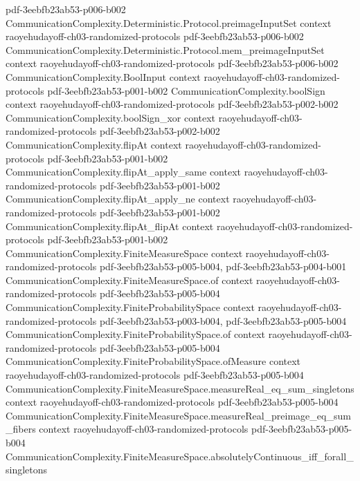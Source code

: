 \begin{theorem}
  {pdf-3eebfb23ab53-p006-b002}
\proofstep
  {CommunicationComplexity.Deterministic.Protocol.preimageInputSet}
  {context}
  {raoyehudayoff-ch03-randomized-protocols}
  {pdf-3eebfb23ab53-p006-b002}
\proofstep
  {CommunicationComplexity.Deterministic.Protocol.mem_preimageInputSet}
  {context}
  {raoyehudayoff-ch03-randomized-protocols}
  {pdf-3eebfb23ab53-p006-b002}
\proofstep
  {CommunicationComplexity.BoolInput}
  {context}
  {raoyehudayoff-ch03-randomized-protocols}
  {pdf-3eebfb23ab53-p001-b002}
\proofstep
  {CommunicationComplexity.boolSign}
  {context}
  {raoyehudayoff-ch03-randomized-protocols}
  {pdf-3eebfb23ab53-p002-b002}
\proofstep
  {CommunicationComplexity.boolSign_xor}
  {context}
  {raoyehudayoff-ch03-randomized-protocols}
  {pdf-3eebfb23ab53-p002-b002}
\proofstep
  {CommunicationComplexity.flipAt}
  {context}
  {raoyehudayoff-ch03-randomized-protocols}
  {pdf-3eebfb23ab53-p001-b002}
\proofstep
  {CommunicationComplexity.flipAt_apply_same}
  {context}
  {raoyehudayoff-ch03-randomized-protocols}
  {pdf-3eebfb23ab53-p001-b002}
\proofstep
  {CommunicationComplexity.flipAt_apply_ne}
  {context}
  {raoyehudayoff-ch03-randomized-protocols}
  {pdf-3eebfb23ab53-p001-b002}
\proofstep
  {CommunicationComplexity.flipAt_flipAt}
  {context}
  {raoyehudayoff-ch03-randomized-protocols}
  {pdf-3eebfb23ab53-p001-b002}
\proofstep
  {CommunicationComplexity.FiniteMeasureSpace}
  {context}
  {raoyehudayoff-ch03-randomized-protocols}
  {pdf-3eebfb23ab53-p005-b004,
    pdf-3eebfb23ab53-p004-b001}
\proofstep
  {CommunicationComplexity.FiniteMeasureSpace.of}
  {context}
  {raoyehudayoff-ch03-randomized-protocols}
  {pdf-3eebfb23ab53-p005-b004}
\proofstep
  {CommunicationComplexity.FiniteProbabilitySpace}
  {context}
  {raoyehudayoff-ch03-randomized-protocols}
  {pdf-3eebfb23ab53-p003-b004,
    pdf-3eebfb23ab53-p005-b004}
\proofstep
  {CommunicationComplexity.FiniteProbabilitySpace.of}
  {context}
  {raoyehudayoff-ch03-randomized-protocols}
  {pdf-3eebfb23ab53-p005-b004}
\proofstep
  {CommunicationComplexity.FiniteProbabilitySpace.ofMeasure}
  {context}
  {raoyehudayoff-ch03-randomized-protocols}
  {pdf-3eebfb23ab53-p005-b004}
\proofstep
  {CommunicationComplexity.FiniteMeasureSpace.measureReal_eq_sum_singletons}
  {context}
  {raoyehudayoff-ch03-randomized-protocols}
  {pdf-3eebfb23ab53-p005-b004}
\proofstep
  {CommunicationComplexity.FiniteMeasureSpace.measureReal_preimage_eq_sum_fibers}
  {context}
  {raoyehudayoff-ch03-randomized-protocols}
  {pdf-3eebfb23ab53-p005-b004}
\proofstep
  {CommunicationComplexity.FiniteMeasureSpace.absolutelyContinuous_iff_forall_singletons}

\end{theorem}
